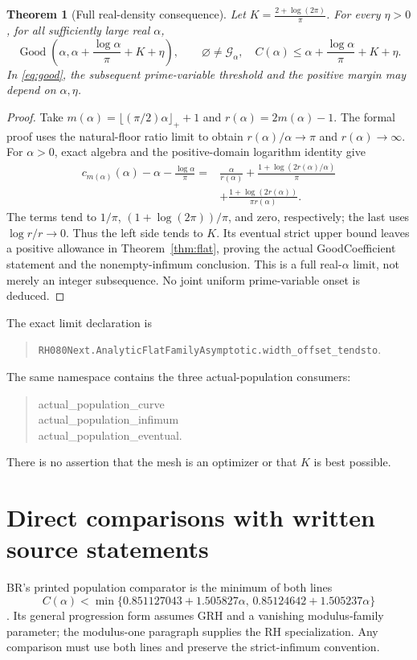 \documentclass[11pt]{article}
\newtheorem{theorem}{Theorem}
\newcommand{\Good}{\operatorname{Good}}
\newcommand{\Kflat}{\frac{2+\log(2\pi)}{\pi}}
\begin{document}
\begin{theorem}[Full real-density consequence]\label{thm:realalpha}
Let \(K=\Kflat\). For every \(\eta>0\), for all sufficiently large real
\(\alpha\),
\[
 \Good\!\left(\alpha,\alpha+\frac{\log\alpha}{\pi}+K+\eta\right),
 \qquad
 \varnothing\ne\mathcal G_\alpha,\quad
 C(\alpha)\le\alpha+\frac{\log\alpha}{\pi}+K+\eta.
 \tag{16}
\]
In \eqref{eq:good}, the subsequent prime-variable threshold and the positive
margin may depend on \(\alpha,\eta\).
\end{theorem}
\begin{proof}
Take \(m(\alpha)=\lfloor(\pi/2)\alpha\rfloor_++1\) and
\(r(\alpha)=2m(\alpha)-1\). The formal proof uses the natural-floor ratio limit
to obtain \(r(\alpha)/\alpha\to\pi\) and \(r(\alpha)\to\infty\).
For \(\alpha>0\), exact algebra and the positive-domain logarithm identity give
\[
 \begin{split}
 c_{m(\alpha)}(\alpha)-\alpha-\frac{\log\alpha}{\pi}
 ={}&\frac{\alpha}{r(\alpha)}
 +\frac{1+\log(2r(\alpha)/\alpha)}{\pi}\\
 &+\frac{1+\log(2r(\alpha))}{\pi r(\alpha)}.
 \end{split}\tag{17}
\]
The terms tend to \(1/\pi\), \((1+\log(2\pi))/\pi\), and zero,
respectively; the last uses \(\log r/r\to0\). Thus the left side tends
to \(K\). Its eventual strict upper bound leaves a positive allowance in
Theorem~\ref{thm:flat}, proving the actual GoodCoefficient statement and the
nonempty-infimum conclusion. This is a full real-\(\alpha\) limit, not merely
an integer subsequence. No joint uniform prime-variable onset is deduced.
\end{proof}
The exact limit declaration is
\begin{quote}\raggedright
\nolinkurl{RH080Next.AnalyticFlatFamilyAsymptotic.width_offset_tendsto}.
\end{quote}
The same namespace contains the three actual-population consumers:
\begin{quote}\ttfamily\raggedright
actual\_population\_curve\\
actual\_population\_infimum\\
actual\_population\_eventual.
\end{quote}
There is no assertion that the mesh is an optimizer or that \(K\) is best
possible.

\section{Direct comparisons with written source statements}
BR's printed population comparator is the minimum of both lines
\[
 C(\alpha)<\min\{0.851127043+1.505827\alpha,\,
                    0.85124642+1.505237\alpha\}
 \tag{18}
\]
\cite[Theorem~2, Eq.~(2), p.~2]{BR}.
Its general progression form assumes GRH and a vanishing modulus-family
parameter; the modulus-one paragraph supplies the RH specialization.
Any comparison must use both lines and preserve the strict-infimum convention.
\end{document}
